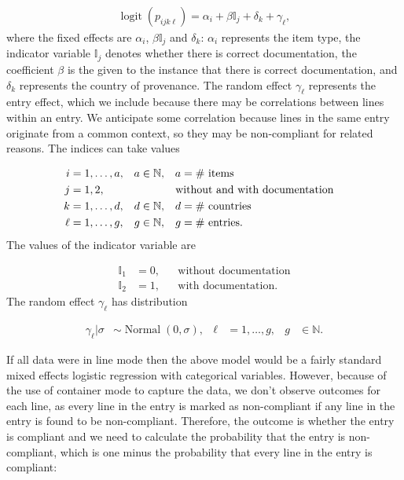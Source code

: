 \documentclass[aoas]{imsart}
\DeclareMathOperator{\logit}{logit}
\DeclareMathOperator{\Normal}{Normal}
\begin{document}
\begin{align}
\logit(p_{ijk\ell}) = \alpha_{i} + \beta\mathbb{I}_j + \delta_k + \gamma_\ell \label{eq:logit_model_sim},
\end{align}
where the fixed effects are $\alpha_i$, $\beta\mathbb{I}_j$ and $\delta_k$: $\alpha_i$ represents the item type, the indicator variable $\mathbb{I}_j$ denotes whether there is correct documentation, the coefficient $\beta$ is the given to the instance that there is correct documentation, and $\delta_k$ represents the country of provenance. The random effect $\gamma_\ell$ represents the entry effect, which we include because there may be correlations between lines within an entry.  {We anticipate some correlation because lines in the same entry originate from a common context, so they may be non-compliant for related reasons}. The indices can take values

\begin{align}
i &=1, \ldots, a, & a&\in \mathbb{N},& a &= \text{\# items}\\
j &= 1, 2, & & & &\text{\hspace{-5pt}without and with documentation}&\\
k &= 1,\ldots, d,& d &\in \mathbb{N},& d &= \text{\# countries}\\
\ell &= 1,\ldots,g,& g&\in \mathbb{N},& g &= \text{\# entries}.
\end{align}
The values of the indicator variable are

\begin{align}
\mathbb{I}_1 & = 0,& &\text{without documentation}\\
\mathbb{I}_2 &= 1,& &\text{with documentation}.
\end{align}
The random effect $\gamma_\ell$ has distribution

\begin{align}
\gamma_\ell | \sigma &\sim \Normal(0, \sigma), & \ell &= 1,\ldots, g, & g&\in \mathbb{N}.
\label{eq:entry_effect}
\end{align}

If all data were in line mode then the above model would be a fairly standard mixed effects logistic regression with categorical variables. However, because of the use of container mode to capture the data, we don't observe outcomes for each line, as every line in the entry is marked as non-compliant if any line in the entry is found to be non-compliant. Therefore, the outcome is whether the entry is compliant and we need to calculate the probability that the entry is non-compliant, which is one minus the probability that every line in the entry is compliant:
\end{document}
